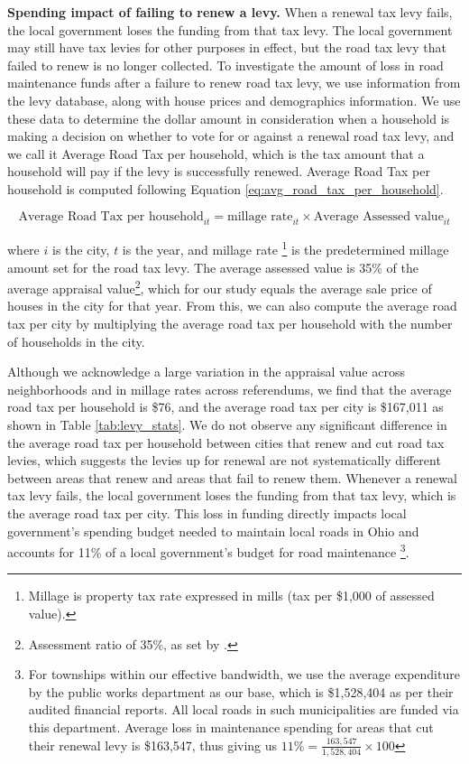 {\bf Spending impact of failing to renew a levy.} When a renewal tax levy fails, the local government loses the funding from that tax levy. The local government may still have tax levies for other purposes in effect, but the road tax levy that failed to renew is no longer collected. To investigate the amount of loss in road maintenance funds after a failure to renew road tax levy, we use information from the levy database, along with house prices and demographics information. We use these data to determine the dollar amount in consideration when a household is making a decision on whether to vote for or against a renewal road tax levy, and we call it Average Road Tax per household, which is the tax amount that a household will pay if the levy is successfully renewed. Average Road Tax per household is computed following Equation \ref{eq:avg_road_tax_per_household}.

\begin{equation}
\text{Average Road Tax per household}_{it} = \text{millage rate}_{it} \times \text{Average Assessed value}_{it}
\label{eq:avg_road_tax_per_household}
\end{equation}

\noindent where $i$ is the city, $t$ is the year, and millage rate \footnote{Millage is property tax rate expressed in mills (tax per \$1,000 of assessed value).} is the predetermined millage amount set for the road tax levy. The average assessed value is 35\% of the average appraisal value\footnote{Assessment ratio of 35\%, as set by \cite{OhioRealPropertyTax}.}, which for our study equals the average sale price of houses in the city for that year. From this, we can also compute the average road tax per city by multiplying the average road tax per household with the number of households in the city.

Although we acknowledge a large variation in the appraisal value across neighborhoods and in millage rates across referendums, we find that the average road tax per household is \$76, and the average road tax per city is \$167,011 as shown in Table \ref{tab:levy_stats}. We do not observe any significant difference in the average road tax per household between cities that renew and cut road tax levies, which suggests the levies up for renewal are not systematically different between areas that renew and areas that fail to renew them. Whenever a renewal tax levy fails, the local government loses the funding from that tax levy, which is the average road tax per city. This loss in funding directly impacts local government's spending budget needed to maintain local roads in Ohio and accounts for 11\% of a local government's budget for road maintenance \footnote{For townships within our effective bandwidth, we use the average expenditure by the public works department as our base, which is \$1,528,404 as per their audited financial reports. All local roads in such municipalities are funded via this department. Average loss in maintenance spending for areas that cut their renewal levy is \$163,547, thus giving us $11\% = \frac{163,547}{1,528,404} \times 100$ }.

